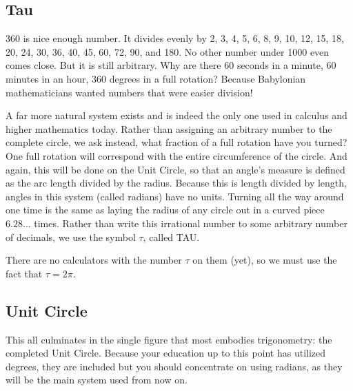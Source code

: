 
\subsection{Tau}
360 is nice enough number.  It divides evenly by 2, 3, 4, 5, 6, 8, 9, 10, 12, 15, 18, 20, 24, 30,
36, 40, 45, 60, 72, 90, and 180.  No other number under 1000 even comes close.  But it
is still arbitrary.  Why are there 60 seconds in a minute, 60 minutes in an hour, 360 degrees
in a full rotation?  Because Babylonian mathematicians wanted numbers that were easier
division!

A far more natural system exists and is indeed the only one used in calculus and higher
mathematics today.  Rather than assigning an arbitrary number to the complete
circle, we ask instead, what fraction of a full rotation have you turned?  One full rotation
will correspond with the entire circumference of the circle.  And again, this will be
done on the Unit Circle, so that an angle's measure is defined as the arc length
divided by the radius.  Because this is length divided by length, angles in this system
(called radians) have no units.  Turning all the way around one time is the same as
laying the radius of any circle out in a curved piece $6.28\dots$ times.  Rather than
write this irrational number to some arbitrary number of decimals, we use the symbol
$\tau$, called TAU.

There are no calculators with the number $\tau$ on them (yet), so we must use 
the fact that $\tau=2\pi$.

\subsection{Unit Circle}
This all culminates in the single figure that most embodies trigonometry: the completed
Unit Circle.  Because your education up to this point has utilized degrees, they are included
but you should concentrate on using radians, as they will be the main system used
from now on.  

